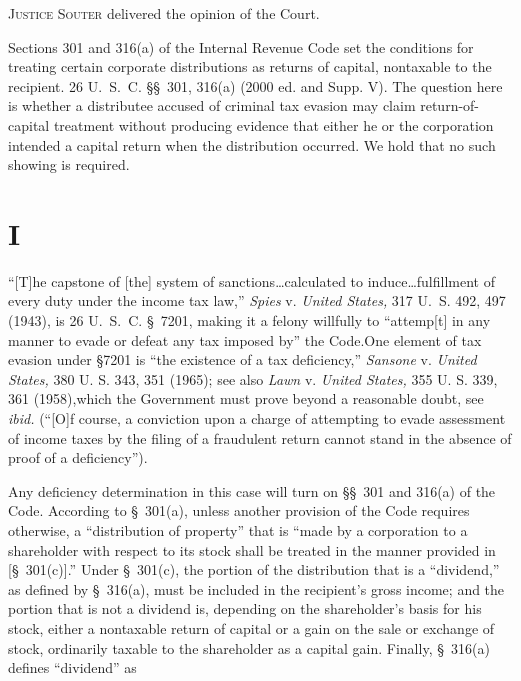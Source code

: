 
\setcounter{page}{424}

  \textsc{Justice Souter} delivered the opinion of the Court.

  Sections 301 and 316(a) of the Internal Revenue Code set the
conditions for treating certain corporate distributions as returns of
capital, nontaxable to the recipient. 26 U.~S.~C. \S\S~301, 316(a)
(2000 ed. and Supp. V). The question here is whether a distributee
accused of criminal tax evasion may claim return-of-capital treatment
without producing evidence that either he or the corporation intended
a capital return when the distribution occurred. We hold that no such
showing is required.

\section{I}

  ``[T]he capstone of [the] system of sanctions\dots calculated to
induce\dots fulfillment of every duty under the income tax law,''
\emph{Spies} v. \emph{United States,} 317 U.~S. 492, 497 (1943), is 26
U.~S.~C. \S~7201, making it a felony willfully to ``attemp[t]
in any manner to evade or defeat any tax imposed by'' the Code.\footnotemark[1]
One element of tax evasion under \S7201 is ``the existence of a
tax deficiency,'' \emph{Sansone} v. \emph{United States,} 380 U. S.
343, 351 (1965); see also \emph{Lawn} v. \emph{United States,} 355 U. S.
339, 361 (1958),\footnotemark[2] which the Government must prove beyond a
reasonable doubt, see \emph{ibid.} (``[O]f course, a conviction upon
a charge of attempting to evade assessment of income taxes by the
filing of a fraudulent return cannot stand in the absence of proof of a
deficiency'').

  Any deficiency determination in this case will turn on \S\S~301 and
316(a) of the Code. According to \S~301(a), unless another provision of
the Code requires otherwise, a ``distri\newpage  bution of property''
that is ``made by a corporation to a shareholder with respect to its
stock shall be treated in the manner provided in [\S~301(c)].'' Under
\S~301(c), the portion of the distribution that is a ``dividend,''
as defined by \S~316(a), must be included in the recipient's gross
income; and the portion that is not a dividend is, depending on the
shareholder's basis for his stock, either a nontaxable return of
capital or a gain on the sale or exchange of stock, ordinarily taxable
to the shareholder as a capital gain. Finally, \S~316(a) defines
``dividend'' as

